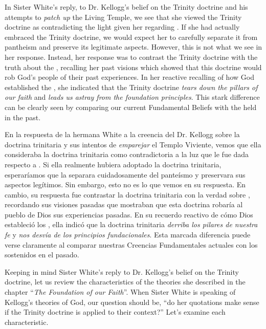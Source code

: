 



In Sister White's reply, to Dr. Kellogg's belief on the Trinity doctrine and his attempts to \textit{patch up} the Living Temple, we see that she viewed the Trinity doctrine as contradicting the light given her regarding . If she had actually embraced the Trinity doctrine, we would expect her to carefully separate it from pantheism and preserve its legitimate aspects. However, this is not what we see in her response. Instead, her response was to contrast the Trinity doctrine with the truth about the , recalling her past visions which showed that this doctrine would rob God's people of their past experiences. In her reactive recalling of how God established the , she indicated that the Trinity doctrine \textit{tears down the pillars of our faith} and \textit{leads us astray from the foundation principles}. This stark difference can be clearly seen by comparing our current Fundamental Beliefs with the  held in the past.


En la respuesta de la hermana White a la creencia del Dr. Kellogg sobre la doctrina trinitaria y sus intentos de \textit{emparejar} el Templo Viviente, vemos que ella consideraba la doctrina trinitaria como contradictoria a la luz que le fue dada respecto a . Si ella realmente hubiera adoptado la doctrina trinitaria, esperaríamos que la separara cuidadosamente del panteísmo y preservara sus aspectos legítimos. Sin embargo, esto no es lo que vemos en su respuesta. En cambio, su respuesta fue contrastar la doctrina trinitaria con la verdad sobre , recordando sus visiones pasadas que mostraban que esta doctrina robaría al pueblo de Dios sus experiencias pasadas. En su recuerdo reactivo de cómo Dios estableció los , ella indicó que la doctrina trinitaria \textit{derriba los pilares de nuestra fe} y \textit{nos desvía de los principios fundacionales}. Esta marcada diferencia puede verse claramente al comparar nuestras Creencias Fundamentales actuales con los  sostenidos en el pasado.


Keeping in mind Sister White’s reply to Dr. Kellogg's belief on the Trinity doctrine, let us review the characteristics of the theories she described in the chapter “\textit{The Foundation of our Faith}”. When Sister White is speaking of Kellogg’s theories of God, our question should be, “do her quotations make sense if the Trinity doctrine is applied to their context?” Let’s examine each characteristic.


